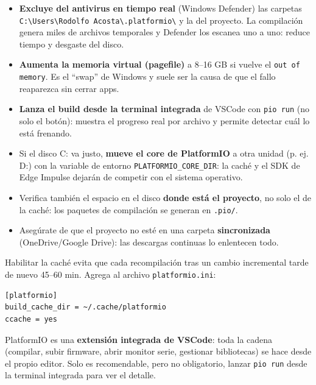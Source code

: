 \documentclass[11pt,a4paper]{article}
\newcommand{\rutaPio}{C:\textbackslash{}Users\textbackslash{}Rodolfo Acosta\textbackslash{}.platformio\textbackslash{}}
\begin{document}
\begin{tcolorbox}[cajaRecomendacion, title={\faIcon{memory}~Memoria y antivirus}]
  \begin{itemize}[leftmargin=1.2em, itemsep=3pt]
    \item \textbf{Excluye del antivirus en tiempo real} (Windows Defender) las carpetas
          \texttt{\rutaPio} y la del proyecto. La compilación genera miles
          de archivos temporales y Defender los escanea uno a uno: reduce tiempo y desgaste del disco.
    \item \textbf{Aumenta la memoria virtual (pagefile)} a 8--16 GB si vuelve el \texttt{out of memory}.
          Es el ``swap'' de Windows y suele ser la causa de que el fallo reaparezca sin cerrar apps.
    \item \textbf{Lanza el build desde la terminal integrada} de VSCode con \texttt{pio run} (no solo
          el botón): muestra el progreso real por archivo y permite detectar cuál lo está frenando.
  \end{itemize}
\end{tcolorbox}

\begin{tcolorbox}[cajaRecomendacion, title={\faIcon{hdd}~Disco}]
  \begin{itemize}[leftmargin=1.2em, itemsep=3pt]
    \item Si el disco C: va justo, \textbf{mueve el core de PlatformIO} a otra unidad (p. ej. D:)
          con la variable de entorno \texttt{PLATFORMIO\_CORE\_DIR}: la caché y el SDK de Edge Impulse
          dejarán de competir con el sistema operativo.
    \item Verifica también el espacio en el disco \textbf{donde está el proyecto}, no solo el de la
          caché: los paquetes de compilación se generan en \texttt{.pio/}.
    \item Asegúrate de que el proyecto no esté en una carpeta \textbf{sincronizada} (OneDrive/Google
          Drive): las descargas continuas lo enlentecen todo.
  \end{itemize}
\end{tcolorbox}

\begin{tcolorbox}[cajaRecomendacion, title={\faIcon{rocket}~Velocidad de compilación}]
  Habilitar la caché evita que cada recompilación tras un cambio incremental tarde de nuevo 45--60 min.
  Agrega al archivo \texttt{platformio.ini}:
\end{tcolorbox}
\begin{lstlisting}
[platformio]
build_cache_dir = ~/.cache/platformio
ccache = yes
\end{lstlisting}
\begin{tcolorbox}[tarjetaDato, title={\faIcon{check-circle}~No necesitas salir de VSCode}]
PlatformIO es una \textbf{extensión integrada de VSCode}: toda la cadena (compilar, subir firmware,
abrir monitor serie, gestionar bibliotecas) se hace desde el propio editor. Solo es recomendable,
pero no obligatorio, lanzar \texttt{pio run} desde la terminal integrada para ver el detalle.
\end{tcolorbox}
\end{document}
